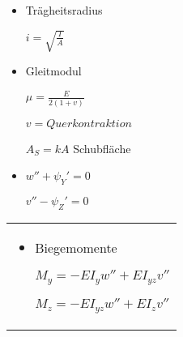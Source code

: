 \documentclass{tudexercise}
\begin{document}
\begin{minipage}[t]{0,47 \textwidth}
\begin{itemize}
        \item{Tr\"agheitsradius}
        
        $i = \sqrt{\frac{I}{A}}$
        
        \item{Gleitmodul}
        
        $\mu = \frac{E}{2(1+v)}$
        
        $v = Querkontraktion$
        
        $A_S = kA $ Schubfl\"ache
        
        \item 
        
        $w'' + \psi_Y' = 0$
        
        $v'' - \psi_Z' = 0$
        

	\end{itemize}
\end{minipage}%
\hfill
\begin{minipage}[t]{0,45 \textwidth}
	\begin{tabular}{|p{\textwidth}}
		\begin{itemize}
			\item{Biegemomente} 
            
            $M_y = -EI_yw'' + EI_{yz}v''$
            
            $M_z = -EI_{yz}w'' + EI_zv''$
		\end{itemize}
		
	\end{tabular}
\end{minipage}%
\end{document}
